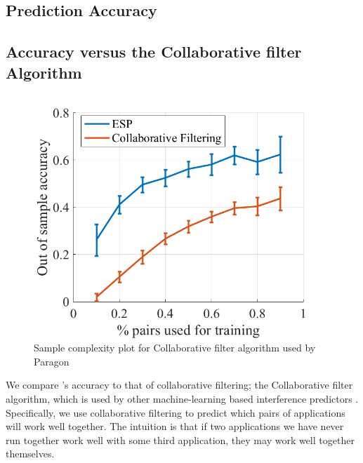 \subsection{\SYSTEM{} Prediction Accuracy}
\label{sec:st_model}


\subsection{\SYSTEM{} Accuracy versus the Collaborative filter Algorithm}
\begin{figure}[!t]
 \includegraphics[width=0.7\columnwidth]{figures/accuracy_netflix_vs_esp.png}
 \caption{Sample complexity plot for Collaborative filter algorithm used by Paragon}
\label{fig:netlix}
\end{figure}
We compare \SYSTEM{}'s accuracy to that of collaborative filtering;
\eg{} the Collaborative filter algorithm, which is used by other machine-learning
based interference predictors \cite{paragon,quasar}.  Specifically, we
use collaborative filtering to predict which pairs of applications
will work well together.  The intuition is that if two applications we
have never run together work well with some third application, they
may work well together themselves.

